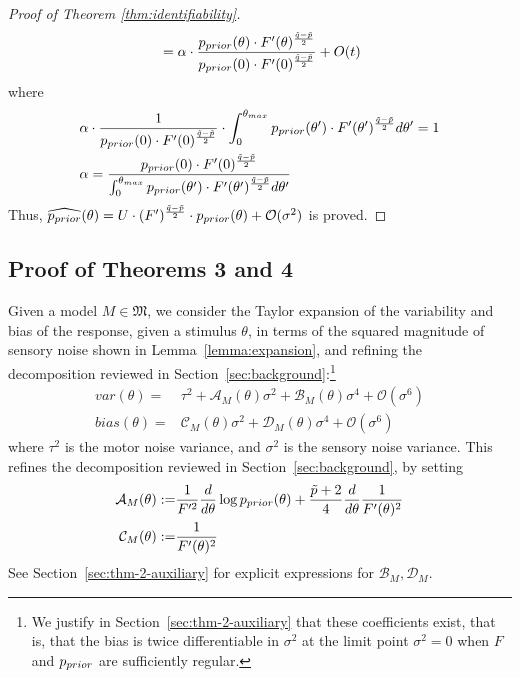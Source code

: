 \begin{proof}[Proof of Theorem \ref{thm:identifiability}]
\begin{align*}
    &= \alpha \cdot \frac{p_{prior}(\theta) \cdot F'(\theta)^{\frac{\tilde{q}-\tilde{p}}{2}}}{p_{prior}(0) \cdot F'(0)^{\frac{\tilde{q}-\tilde{p}}{2}}} + O(t)\\
\end{align*}
where
\begin{align*}
    \alpha &\cdot \frac{1}{p_{prior}(0) \cdot F'(0)^{\frac{\tilde{q}-\tilde{p}}{2}}} \cdot \int_0^{\theta_{max}} p_{prior}(\theta') \cdot F'(\theta')^{\frac{\tilde{q}-\tilde{p}}{2}} d\theta' = 1\\
    \alpha &= \frac{p_{prior}(0) \cdot F'(0)^{\frac{\tilde{q}-\tilde{p}}{2}}}{\int_0^{\theta_{max}} p_{prior}(\theta') \cdot F'(\theta')^{\frac{\tilde{q}-\tilde{p}}{2}} d\theta'}\\  
\end{align*}
Thus, $\widehat{p_{prior}}(\theta) = U \cdot (F')^{\frac{\tilde{q}-\tilde{p}}{2}} \cdot p_{prior}(\theta) + \mathcal{O}(\sigma^2)$ is proved.

\end{proof}


\subsection{Proof of Theorems 3 and 4}\label{sec:theorems-two-levels}


Given a model $M \in \mathfrak{M}$, we consider the Taylor expansion of the variability and bias of the response, given a stimulus $\theta$, in terms of the squared magnitude of sensory noise shown in Lemma~\ref{lemma:expansion}, and refining the decomposition reviewed in Section~\ref{sec:background}:\footnote{We justify in Section~\ref{sec:thm-2-auxiliary} that these coefficients exist, that is, that the bias is twice differentiable in $\sigma^2$ at the limit point $\sigma^2=0$ when $F$ and $p_{prior}$ are sufficiently regular.}
\begin{align*}
var(\theta) =& 
\tau^2 + \mathcal{A}_M(\theta) \sigma^2 + \mathcal{B}_M(\theta) \sigma^4 + \mathcal{O}(\sigma^6) \\
    bias(\theta) =& %
    \mathcal{C}_M(\theta) \sigma^2 + \mathcal{D}_M(\theta) \sigma^4 + \mathcal{O}(\sigma^6)
\end{align*}
where $\tau^2$ is the motor noise variance, and $\sigma^2$ is the sensory noise variance. This refines the decomposition reviewed in Section~\ref{sec:background}, by setting
\begin{align*}
    \mathcal{A}_M(\theta) :=& \frac{1}{F'^2} \frac{d}{d\theta} \log p_{prior}(\theta) + \frac{\tilde{p}+2}{4} \frac{d}{d\theta} \frac{1}{F'(\theta)^2} \\
    \mathcal{C}_M(\theta) :=& \frac{1}{F'(\theta)^2}
\end{align*}
See Section~\ref{sec:thm-2-auxiliary} for explicit expressions for $\mathcal{B}_M, \mathcal{D}_M$.

